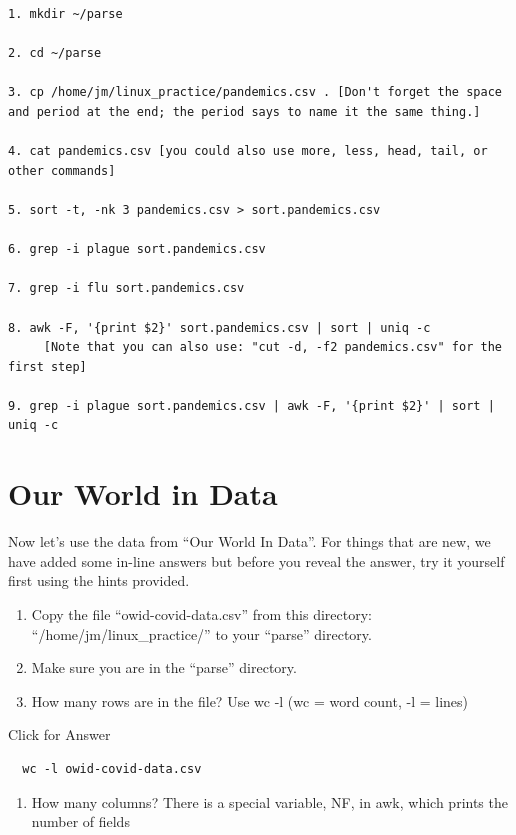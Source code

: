 \documentclass[
]{book}
\providecommand{\tightlist}{%
  \setlength{\itemsep}{0pt}\setlength{\parskip}{0pt}}
\begin{document}
\begin{verbatim}
1. mkdir ~/parse

2. cd ~/parse

3. cp /home/jm/linux_practice/pandemics.csv . [Don't forget the space and period at the end; the period says to name it the same thing.]

4. cat pandemics.csv [you could also use more, less, head, tail, or other commands]

5. sort -t, -nk 3 pandemics.csv > sort.pandemics.csv

6. grep -i plague sort.pandemics.csv

7. grep -i flu sort.pandemics.csv

8. awk -F, '{print $2}' sort.pandemics.csv | sort | uniq -c
     [Note that you can also use: "cut -d, -f2 pandemics.csv" for the first step]

9. grep -i plague sort.pandemics.csv | awk -F, '{print $2}' | sort | uniq -c
\end{verbatim}

\hypertarget{our-world-in-data-1}{%
\section{Our World in Data}\label{our-world-in-data-1}}

Now let's use the data from ``Our World In Data''. For things that are new, we have added some in-line answers but before you reveal the answer, try it yourself first using the hints provided.

\begin{enumerate}
\def\labelenumi{\arabic{enumi}.}
\setcounter{enumi}{9}
\item
  Copy the file ``owid-covid-data.csv'' from this directory: ``/home/jm/linux\_practice/'' to your ``parse'' directory.
\item
  Make sure you are in the ``parse'' directory.
\item
  How many rows are in the file? Use wc -l (wc = word count, -l = lines)
\end{enumerate}

Click for Answer

\begin{verbatim}
  wc -l owid-covid-data.csv
\end{verbatim}

\hfill\break

\begin{enumerate}
\def\labelenumi{\arabic{enumi}.}
\setcounter{enumi}{12}
\tightlist
\item
  How many columns? There is a special variable, NF, in awk, which prints the number of fields
\end{enumerate}
\end{document}
